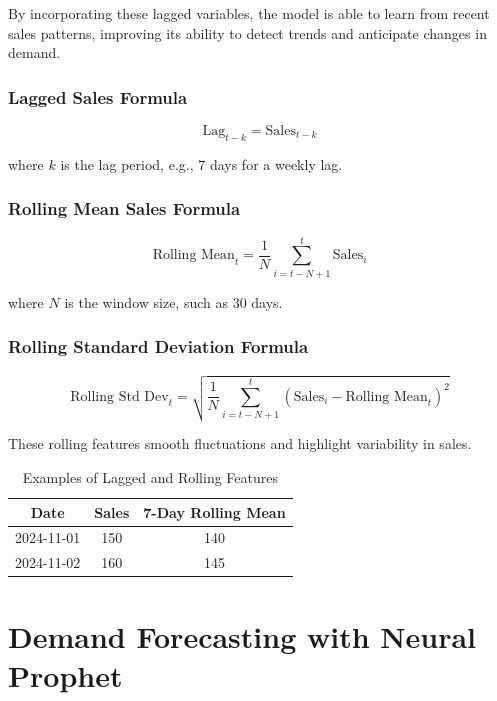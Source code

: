 By incorporating these lagged variables, the model is able to learn from recent sales patterns, improving its ability to detect trends and anticipate changes in demand.

\subsubsection{Lagged Sales Formula}

\begin{equation}
    \text{Lag}_{t-k} = \text{Sales}_{t-k}
\end{equation}

where \( k \) is the lag period, e.g., 7 days for a weekly lag.

\subsubsection{Rolling Mean Sales Formula}

\begin{equation}
    \text{Rolling Mean}_t = \frac{1}{N} \sum_{i=t-N+1}^{t} \text{Sales}_i
\end{equation}

where \( N \) is the window size, such as 30 days.

\subsubsection{Rolling Standard Deviation Formula}

\begin{equation}
    \text{Rolling Std Dev}_t = \sqrt{\frac{1}{N} \sum_{i=t-N+1}^{t} (\text{Sales}_i - \text{Rolling Mean}_t)^2}
\end{equation}

These rolling features smooth fluctuations and highlight variability in sales.

\begin{table}[H]
\centering
\caption{Examples of Lagged and Rolling Features}
\begin{tabular}{|c|c|c|}
\hline
\textbf{Date} & \textbf{Sales} & \textbf{7-Day Rolling Mean} \\ \hline
2024-11-01 & 150 & 140 \\ \hline
2024-11-02 & 160 & 145 \\ \hline
\end{tabular}
\end{table}



\section{Demand Forecasting with Neural Prophet}



